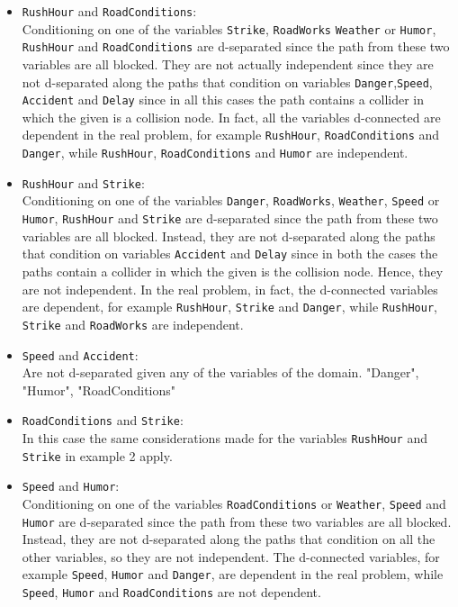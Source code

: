 \documentclass[a4paper,12pt]{article} %
\begin{document}
\begin{itemize}
	\item \texttt{RushHour} and \texttt{RoadConditions}:\\	
	Conditioning on one of the variables \texttt{Strike}, \texttt{RoadWorks} \texttt{Weather} or \texttt{Humor}, \texttt{RushHour} and \texttt{RoadConditions} are d-separated since the path from these two variables are all blocked.
	They are not actually independent since they are not d-separated along the paths that condition on variables
	\texttt{Danger},\texttt{Speed}, \texttt{Accident} and \texttt{Delay} since in all this cases the path contains a collider in which the given is a collision node.
	In fact, all the variables d-connected are dependent in the real problem, for example \texttt{RushHour}, \texttt{RoadConditions} and \texttt{Danger}, while \texttt{RushHour}, \texttt{RoadConditions} and \texttt{Humor} are independent.
	
	\item \texttt{RushHour} and \texttt{Strike}:\\
	Conditioning on one of the variables \texttt{Danger}, \texttt{RoadWorks}, \texttt{Weather}, \texttt{Speed} or \texttt{Humor}, \texttt{RushHour} and \texttt{Strike} are d-separated since the path from these two variables are all blocked.
	Instead, they are not d-separated along the paths that condition on variables \texttt{Accident} and \texttt{Delay} since in both the cases the paths contain a collider in which the given is the collision node. Hence, they are not independent.
	In the real problem, in fact, the d-connected variables are dependent, for example \texttt{RushHour}, \texttt{Strike} and \texttt{Danger}, while \texttt{RushHour}, \texttt{Strike} and \texttt{RoadWorks} are independent.
	
	\item \texttt{Speed} and \texttt{Accident}:\\
	Are not d-separated given any of the variables of the domain.
	"Danger", "Humor", "RoadConditions"
	
	\item \texttt{RoadConditions} and \texttt{Strike}:\\
	In this case the same considerations made for the variables \texttt{RushHour} and \texttt{Strike} in example 2 apply.
	
	\item \texttt{Speed} and \texttt{Humor}:\\
	Conditioning on one of the variables \texttt{RoadConditions} or \texttt{Weather}, \texttt{Speed} and \texttt{Humor} are d-separated since the path from these two variables are all blocked.
	Instead, they are not d-separated along the paths that condition on all the other variables, so they are not independent.
	The d-connected variables, for example \texttt{Speed}, \texttt{Humor} and \texttt{Danger}, are dependent in the real problem, while \texttt{Speed}, \texttt{Humor} and \texttt{RoadConditions} are not dependent.

\end{itemize}
\end{document}
